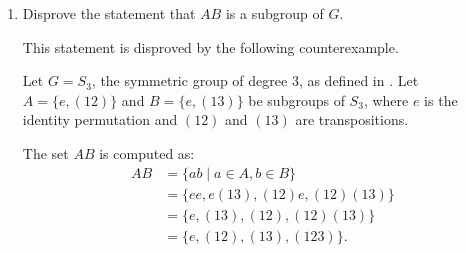 \begin{enumerate}
\begin{enumerate}
\begin{subprove}
      \begin{itemize}
        \item \textbf{Nonemptyness:} Since $A$ and $B$ are subgroups, they both contain the identity element $e$ of $G$.
        Therefore, $e = e e \in A B$, and hence $A B$ is nonempty.
        
        \item \textbf{Closure:} Let $a_1 b_1, a_2 b_2 \in A B$, where $a_1, a_2 \in A$ and $b_1, b_2 \in B$.
        Since $G$ is abelian,
        \[
          (a_1 b_1) (a_2 b_2) = a_1 (b_1 a_2) b_2 = a_1 (a_2 b_1) b_2 = (a_1 a_2) (b_1 b_2).
        \]
        Since $A$ and $B$ are subgroups, $a_1 a_2 \in A$ and $b_1 b_2 \in B$ by closure.
        Therefore, $(a_1 b_1) (a_2 b_2) = (a_1 a_2) (b_1 b_2) \in A B$, and hence $A B$ is closed under the group operation.
        
        \item \textbf{Inverses:} Let $a b \in A B$, where $a \in A$ and $b \in B$.
        Since $A$ and $B$ are subgroups, $a^{-1} \in A$ and $b^{-1} \in B$ by existence of inverses.
        Since $G$ is abelian,
        \[
          (a b)^{-1} = b^{-1} a^{-1} = a^{-1} b^{-1} \in A B.
        \]
        Therefore, every element in $A B$ has its inverse in $A B$.
      \end{itemize}
      
      Since $A B$ is nonempty, closed under the group operation, and contains inverses,
      it is concluded by  that $A B$ is a subgroup of $G$.
    \end{subprove}
    \item Disprove the statement that $A B$ is a subgroup of $G$.
    \begin{subprove}
      This statement is disproved by the following counterexample.
      
      Let $G = S_3$, the symmetric group of degree 3, as defined in .
      Let $A = \{e, (12)\}$ and $B = \{e, (13)\}$ be subgroups of $S_3$,
      where $e$ is the identity permutation and $(12)$ and $(13)$ are transpositions.
      
      The set $A B$ is computed as:
      \begin{align*}
        A B &= \{a b \mid a \in A, b \in B\} \\
        &= \{e e, e (13), (12) e, (12) (13)\} \\
        &= \{e, (13), (12), (12)(13)\} \\
        &= \{e, (12), (13), (123)\}.
      \end{align*}
      

\end{subprove}
\end{enumerate}
\end{enumerate}
